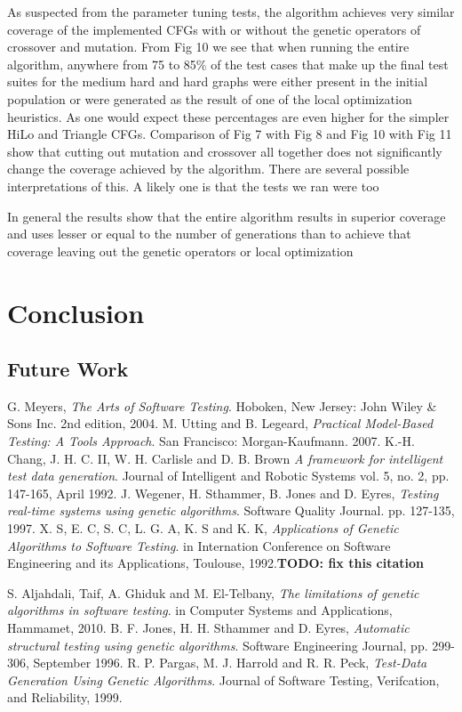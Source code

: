 \documentclass[runningheads]{llncs}
\begin{document}
As suspected from the parameter tuning tests, the algorithm achieves very similar coverage of the implemented CFGs with or without the genetic operators of crossover and mutation. From Fig 10 we see that when running the entire algorithm, anywhere from 75 to 85\% of the test cases that make up the final test suites for the medium hard and hard graphs were either present in the initial population or were generated as the result of one of the local optimization heuristics. As one would expect these percentages are even higher for the simpler HiLo and Triangle CFGs. Comparison of Fig 7 with Fig 8 and Fig 10 with Fig 11 show that cutting out mutation and crossover all together does not significantly change the coverage achieved by the algorithm. 
There are several possible interpretations of this. A likely one is that the tests we ran were too 


In general the results show that the entire algorithm results in superior coverage and uses lesser or equal to the number of generations than to achieve that coverage leaving out the genetic operators or local optimization 

\newpage
\section{Conclusion}

\subsection{Future Work}

\newpage
\begin{thebibliography}{9}

  G. Meyers,
  \emph{The Arts of Software Testing}.
  Hoboken, New Jersey: John Wiley \& Sons Inc.
  2nd edition,
   2004.
  M. Utting and B. Legeard,
  \emph{Practical Model-Based Testing: A Tools Approach}.
  San Francisco: Morgan-Kaufmann.
   2007.
  	K.-H. Chang, J. H. C. II, W. H. Carlisle and D. B. Brown
  \emph{A framework for intelligent test data generation}.
  Journal of Intelligent and Robotic Systems
  vol. 5, 
  no. 2, 
  pp. 147-165, 
  April 1992.
  	J. Wegener, H. Sthammer, B. Jones and D. Eyres,
  \emph{Testing real-time systems using genetic algorithms}.
  Software Quality Journal.
  pp. 127-135, 
  1997.    
  X. S, E. C, S. C, L. G. A, K. S and K. K,
  \emph{Applications of Genetic Algorithms to Software Testing}.
  in Internation Conference on Software Engineering and its Applications, 
  Toulouse, 
  1992.\textbf{TODO: fix this citation}
  
  	S. Aljahdali, Taif, A. Ghiduk and M. El-Telbany,
  \emph{The limitations of genetic algorithms in software testing}.
  in Computer Systems and Applications, 
  Hammamet, 
  2010. 
  	B. F. Jones, H. H. Sthammer and D. Eyres,
  \emph{Automatic structural testing using genetic algorithms}.
  Software Engineering Journal, 
  pp. 299-306, 
  September 1996.  
  	R. P. Pargas, M. J. Harrold and R. R. Peck,
  \emph{Test-Data Generation Using Genetic Algorithms}.
  Journal of Software Testing, Verifcation, and Reliability, 
  1999.      
\end{thebibliography}
\end{document}
